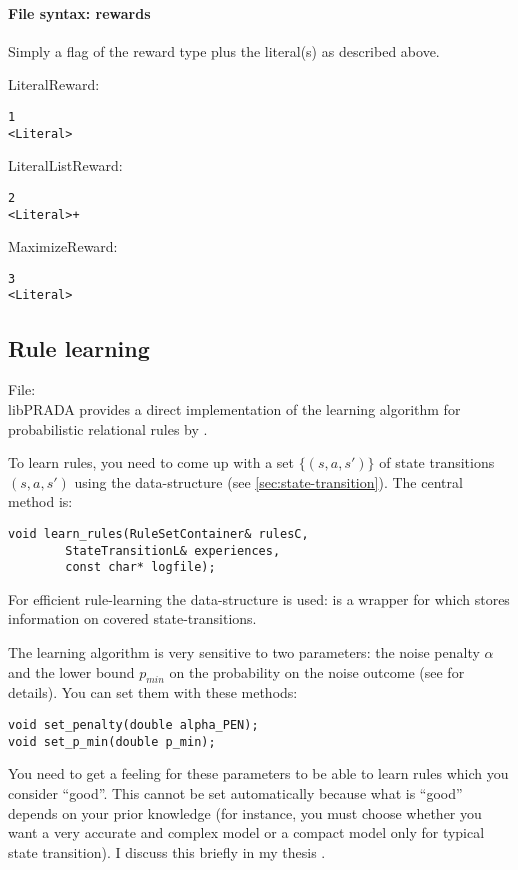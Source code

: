 \documentclass[10pt,twoside,twocolumn,fleqn]{article}
\begin{document}
\paragraph{File syntax: rewards}

Simply a flag of the reward type plus the literal(s) as described above.

LiteralReward:
\begin{lstlisting}
1
<Literal>
\end{lstlisting}

LiteralListReward:
\begin{lstlisting}
2
<Literal>+
\end{lstlisting}

MaximizeReward:
\begin{lstlisting}
3
<Literal>
\end{lstlisting}







\subsection{Rule learning}

File: \\

libPRADA provides a direct implementation of the learning algorithm for
probabilistic relational rules by \citet{pasula07ai}.

To learn rules, you need to come up with a set $\{(s,a,s')\}$ of state
transitions $(s,a,s')$ using the data-structure  (see
\ref{sec:state-transition}). The central method is:
\begin{lstlisting}
void learn_rules(RuleSetContainer& rulesC,
		StateTransitionL& experiences,
		const char* logfile);
\end{lstlisting}
For efficient rule-learning the data-structure  is
used:  is a wrapper for  which stores
information on covered state-transitions.

The learning algorithm is very sensitive to two parameters: the noise
penalty $\alpha$ and the lower bound $p_{min}$ on the probability on the
noise outcome (see \cite{lang-toussaint-10jair,pasula07ai} for details).
You can set them with these methods:
\begin{lstlisting}
void set_penalty(double alpha_PEN);
void set_p_min(double p_min);
\end{lstlisting}
You need to get a feeling for these parameters to be able to learn rules
which you consider ``good''. This cannot be set automatically because what
is ``good'' depends on your prior knowledge (for instance, you must choose
whether you want a very accurate and complex model or a compact model only
for typical state transition). I discuss this briefly in my thesis
\cite{11-lang-phd}.
\end{document}
